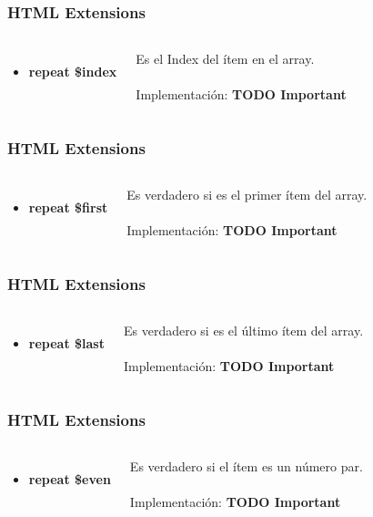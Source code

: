 \documentclass{beamer}
\begin{document}
\begin{frame}
\frametitle{HTML Extensions}
\begin{columns}[c]
\begin{itemize}
\item \textbf{repeat \$index}
\end{itemize}
Es el Index del \'item en el array.
\\~\\
Implementaci\'on: \textbf{TODO Important}
\end{columns}
\end{frame}
\begin{frame}
\frametitle{HTML Extensions}
\begin{columns}[c]
\begin{itemize}
\item \textbf{repeat \$first}
\end{itemize}
Es verdadero si es el primer \'item del array.
\\~\\
Implementaci\'on: \textbf{TODO Important}
\end{columns}
\end{frame}
\begin{frame}
\frametitle{HTML Extensions}
\begin{columns}[c]
\begin{itemize}
\item \textbf{repeat \$last}
\end{itemize}
Es verdadero si es el \'ultimo \'item del array.
\\~\\
Implementaci\'on: \textbf{TODO Important}
\end{columns}
\end{frame}
\begin{frame}
\frametitle{HTML Extensions}
\begin{columns}[c]
\begin{itemize}
\item \textbf{repeat \$even}
\end{itemize}
Es verdadero si el \'item es un n\'umero par.
\\~\\
Implementaci\'on: \textbf{TODO Important}
\end{columns}
\end{frame}
\end{document}
